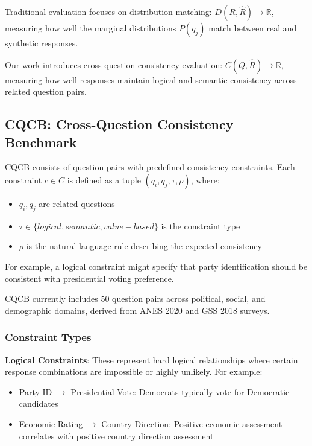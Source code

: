 \documentclass[sigconf, anonymous]{acmart}
\begin{document}
Traditional evaluation focuses on distribution matching: $D(R, \hat{R}) \rightarrow \mathbb{R}$, measuring how well the marginal distributions $P(q_j)$ match between real and synthetic responses.

Our work introduces cross-question consistency evaluation: $C(Q, \hat{R}) \rightarrow \mathbb{R}$, measuring how well responses maintain logical and semantic consistency across related question pairs.

\subsection{CQCB: Cross-Question Consistency Benchmark}

CQCB consists of question pairs with predefined consistency constraints. Each constraint $c \in C$ is defined as a tuple $(q_i, q_j, \tau, \rho)$, where:

\begin{itemize}
    \item $q_i, q_j$ are related questions
    \item $\tau \in \{logical, semantic, value-based\}$ is the constraint type
    \item $\rho$ is the natural language rule describing the expected consistency
\end{itemize}

For example, a logical constraint might specify that party identification should be consistent with presidential voting preference.

CQCB currently includes 50 question pairs across political, social, and demographic domains, derived from ANES 2020 and GSS 2018 surveys.

\subsubsection{Constraint Types}

\textbf{Logical Constraints}: These represent hard logical relationships where certain response combinations are impossible or highly unlikely. For example:
\begin{itemize}
    \item Party ID $\rightarrow$ Presidential Vote: Democrats typically vote for Democratic candidates
    \item Economic Rating $\rightarrow$ Country Direction: Positive economic assessment correlates with positive country direction assessment
\end{itemize}
\end{document}
